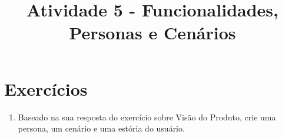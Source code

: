 \documentclass[12pt,a4paper]{article}
\title{Atividade 5 - Funcionalidades, Personas e Cenários }
\author{}
\date{}
\begin{document}
   \maketitle
   \section*{Exercícios}
      \begin{enumerate}
         \item Baseado na sua resposta do exercício sobre Visão do Produto, crie uma persona, um cenário e uma estória do usuário.
      \end{enumerate}
      
\end{document}
